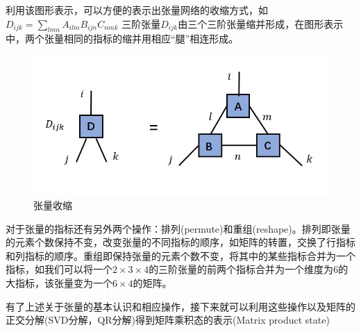 \documentclass[12pt]{article}
\begin{document}
	   利用该图形表示，可以方便的表示出张量网络的收缩方式，如$ D_{ijk}=\sum_{lmn}A_{ilm}B_{ijn}C_{nmk} $ 三阶张量$ D_{ijk}$由三个三阶张量缩并形成，在图形表示中，两个张量相同的指标的缩并用相应“腿”相连形成。
	   \begin{figure}[H]
	   	\centering
	   	\includegraphics[scale=0.7]{2.张量网络收缩}
	   	\caption[9pt]{ 张量收缩}
	   	\label{fig:2}
	   \end{figure}
   
	   对于张量的指标还有另外两个操作：排列(permute)和重组(reshape)。排列即张量的元素个数保持不变，改变张量的不同指标的顺序，如矩阵的转置，交换了行指标和列指标的顺序。重组即保持张量的元素个数不变，将其中的某些指标合并为一个指标，如我们可以将一个$2\times3\times4$的三阶张量的前两个指标合并为一个维度为$6$的大指标，该张量变为一个$6\times4$的矩阵。
	   
	   有了上述关于张量的基本认识和相应操作，接下来就可以利用这些操作以及矩阵的正交分解(SVD分解，QR分解)得到矩阵乘积态的表示(Matrix product state)
	   
\end{document}
